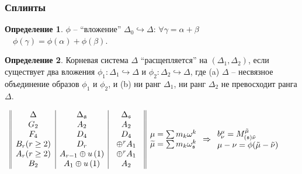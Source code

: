 \documentclass[pdftex]{beamer}
\newcommand{\sfr}{\mathfrak{s}}
\theoremstyle{definition} \newtheorem{Def}{Определение}
\begin{document}
\begin{frame}
  \frametitle{Сплинты}
  \begin{Def}
$\phi $ -- ``вложение'' $\Delta_{0}\hookrightarrow \Delta$: $\forall  \gamma =\alpha+\beta$ $\quad\phi (\gamma )=\phi (\alpha )+\phi (\beta ).$

\end{Def}

\begin{Def}
Корневая система $\Delta$ ``расщепляется'' на  $(\Delta _{1},\Delta _{2})$, если существует два вложения  $\phi _{1}:\Delta _{1}\hookrightarrow \Delta $ и $\phi _{2}:\Delta _{2}\hookrightarrow \Delta $, где (a) $\Delta $ -- несвязное объединение образов $\phi _{1}$ и $\phi _{2}$, и (b) ни ранг  $\Delta _{1}$, ни ранг  $\Delta _{2}$ не превосходит ранга $\Delta $.
\end{Def}
\begin{equation*}
\hspace{-0.5cm}
\begin{array}{||c|c|c||}
  \hspace{0.25in}\Delta \hspace{0.25in} & \hspace{0.25in}\Delta
_{\frak{a}}\hspace{0.25in} & \hspace{0.15in}\Delta _{\frak{s}}\hspace{0.15in}
\\ %
G_{2} & A_{2} & A_{2} \\
F_{4} & D_{4} & D_{4} \\ %
B_{r}(r\geq 2) & D_{r} & \oplus ^{r}A_{1}  \\ %
A_{r}(r\geq 2) & A_{r-1}\oplus u\left( 1\right)  & \oplus
^{r}A_{1} \\
B_{2} & A_{1}\oplus u\left( 1\right)  & A_{2}
\end{array} 
\begin{array}{l}
  \mu=\sum m_{k}\omega ^{k}\\
  \widetilde{\mu }=\sum m_{k}\omega _{\sfr}^{k}
\end{array}
\Rightarrow
\begin{array}{l}
  b^{\mu}_{\nu}= M^{\tilde{\mu}}_{(\sfr) \tilde\nu}  \\
  \mu-\nu=\phi(\tilde\mu-\tilde\nu) %
\end{array}
\end{equation*}


\end{frame}
\end{document}
